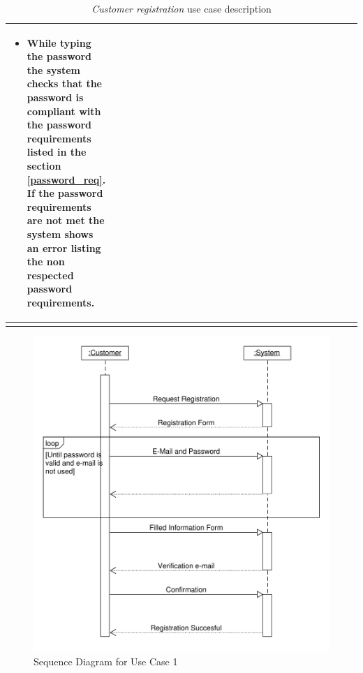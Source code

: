\begin{longtable}{p{0.25\linewidth}p{0.75\linewidth}}
\begin{itemize}
        \item While typing the password the system checks that the password is compliant with the password requirements listed in the section \ref{password_req}. If the password requirements are not met the system shows an error listing the non respected password requirements.
    \end{itemize}                                                                                                                                     \\
    \bottomrule
    \caption{\emph{Customer registration} use case description}
\end{longtable}

\begin{figure}[H]
    \includegraphics[width=\textwidth]{Images/UML_Seq_Diag_1.pdf}
    \caption{\label{fig:Use_Case_Diag}Sequence Diagram for Use Case 1}
\end{figure}

